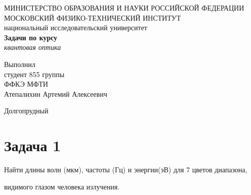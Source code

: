 \documentclass[14pt,a4paper]{article}
\begin{document}
	\begin{titlepage}
		\begin{center}
		МИНИСТЕРСТВО ОБРАЗОВАНИЯ И НАУКИ РОССИЙСКОЙ ФЕДЕРАЦИИ\\
		\vspace{0.5cm}
		\footnotesize{\Large{МОСКОВСКИЙ ФИЗИКО-ТЕХНИЧЕСКИЙ ИНСТИТУТ}}\\
		\vspace{0.15cm}
		\footnotesize{\Large{национальный исследовательский университет}}\\
		\vspace{6cm}
		{\LARGE
		\textbf{Задачи по курсу}}\\
		\large{\textit{квантовая оптика}}\\
		\vspace{8cm}
		\begin{flushright}
			Выполнил\\
			студент 855 группы\\
			ФФКЭ МФТИ\\
			Атепалихин Артемий Алексеевич
		\end{flushright}
		\vfill
		Долгопрудный\\
		\the\year\:
		\end{center}
	\end{titlepage}
	
	\pagestyle{fancy} 
    \fancyfoot[C]{ \noindent\rule{\textwidth}{0.4pt} \thepage }
	
	\newpage
	

\section*{Задача 1}
    
    \par \textsf{Найти длины волн (мкм), частоты (Гц) и энергии(эВ) для 7 цветов диапазона,}\\
    \par \textsf{видимого глазом человека излучения.}\\
    
\end{document}
